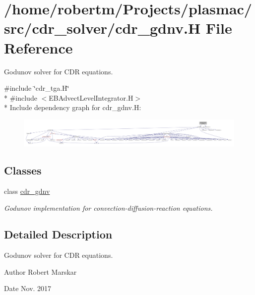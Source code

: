 \hypertarget{cdr__gdnv_8H}{}\section{/home/robertm/\+Projects/plasmac/src/cdr\+\_\+solver/cdr\+\_\+gdnv.H File Reference}
\label{cdr__gdnv_8H}


Godunov solver for C\+DR equations.  


{\ttfamily \#include \char`\"{}cdr\+\_\+tga.\+H\char`\"{}}\\*
{\ttfamily \#include $<$E\+B\+Advect\+Level\+Integrator.\+H$>$}\\*
Include dependency graph for cdr\+\_\+gdnv.\+H\+:\nopagebreak
\begin{figure}[H]
\begin{center}
\leavevmode
\includegraphics[width=350pt]{cdr__gdnv_8H__incl}
\end{center}
\end{figure}
\subsection*{Classes}
\begin{DoxyCompactItemize}
\item 
class \hyperlink{classcdr__gdnv}{cdr\+\_\+gdnv}
\begin{DoxyCompactList}\small\item\em Godunov implementation for convection-\/diffusion-\/reaction equations. \end{DoxyCompactList}\end{DoxyCompactItemize}


\subsection{Detailed Description}
Godunov solver for C\+DR equations. 

\begin{DoxyAuthor}{Author}
Robert Marskar 
\end{DoxyAuthor}
\begin{DoxyDate}{Date}
Nov. 2017 
\end{DoxyDate}
